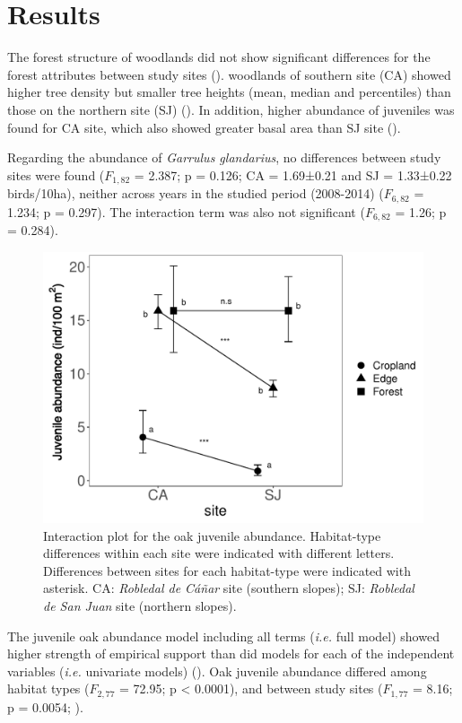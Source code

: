 \section{Results}\label{sec:coloniza:results}

The forest structure of \Qpy woodlands did not show significant differences for the forest attributes between study sites  (). \Qpy woodlands of southern site (CA) showed higher tree density but smaller tree heights (mean, median and percentiles) than those on the northern site (SJ) (). In addition, higher abundance of juveniles was found for CA site, which also showed greater basal area than SJ site ().

Regarding the abundance of \emph{Garrulus glandarius}, no differences between study sites were found (\(F_{1,82}\) = 2.387; p = 0.126; CA = 1.69±0.21 and SJ = 1.33±0.22 birds/10ha), neither across years in the studied period (2008-2014) (\(F_{6,82}\) = 1.234; p = 0.297). The interaction term was also not significant (\(F_{6,82}\) = 1.26; p = 0.284).

\begin{figure}[H]
    \centering
    \includegraphics[width=\textwidth,height=8cm,
  keepaspectratio]{img/coloniza/coloniza-juvenile-interaction.pdf}
    \caption{Interaction plot for the oak juvenile abundance. Habitat-type differences within each site were indicated with different letters. Differences between sites for each habitat-type were indicated with asterisk. CA: \emph{Robledal de Cáñar} site (southern slopes); SJ: \emph{Robledal de San Juan} site (northern slopes).}
    \label{fig:coloniza:interaction}
\end{figure}

The juvenile oak abundance model including all terms (\emph{i.e.} full model) showed higher strength of empirical support than did models for each of the independent variables (\emph{i.e.} univariate models) (). Oak juvenile abundance differed among habitat types (\(F_{2,77}\) = 72.95; p < 0.0001), and between study sites (\(F_{1,77}\) = 8.16; p = 0.0054; ). 

